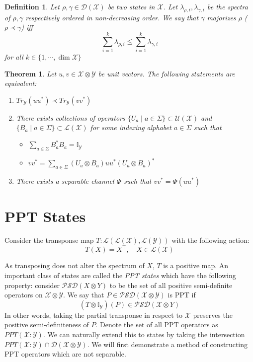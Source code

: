 \documentclass[12pt]{article}
\newcommand{\X}{\mathcal{X}}
\newcommand{\Y}{\mathcal{Y}}
\newcommand{\LX}{\mathcal{L}(\mathcal{X})}
\newcommand{\DX}{\mathcal{D}(\mathcal{X})}
\newtheorem{definition}{Definition}
\newtheorem{theorem}{Theorem}
\begin{document}
\begin{definition}
  Let $\rho, \gamma \in \DX$ be two states in $\X$. Let $\lambda_{\rho, i}, \lambda_{\gamma, i}$ be the spectra of $\rho, \gamma$ respectively ordered in non-decreasing order. We say that $\gamma$ majorizes $\rho$ ($\rho \prec \gamma$) iff
  \[ \sum_{i=1}^k \lambda_{\rho, i} \leq \sum_{i=1}^k \lambda_{\gamma, i} \] for all $k \in \{1,\cdots,\dim{\X}\}$
\end{definition}

\begin{theorem}
  Let $u,v \in \X \otimes \Y$ be unit vectors. The following statements are equivalent:\
  \begin{enumerate}
    \item $Tr_\Y(uu^*) \prec Tr_\Y(vv^*)$
    \item There exists collections of operators $\{U_a\mid a \in \Sigma \} \subset \mathcal{U}(\X)$ and $\{B_a \mid a \in \Sigma\} \subset \LX$ for some indexing alphabet $a \in \Sigma$ such that
    \begin{itemize}
      \item $\sum_{a \in \Sigma} B_a^*B_a = \mathbb{I}_\Y$
      \item $vv^* = \sum_{a \in \Sigma} (U_a \otimes B_a)uu^* (U_a \otimes B_a)^*$
    \end{itemize}
      \item There exists a separable channel $\Phi$ such that $vv^* = \Phi(uu^*)$
  \end{enumerate}
\end{theorem}


\section{PPT States}
 Consider the transponse map $T: \mathcal{L}(\mathcal{L}(\mathcal{X}), \mathcal{L}(\mathcal{Y}))$ with the following action:
\[
T(X) = X^{\intercal}, \quad X \in \LX
\]

As transposing does not alter the spectrum of $X$, $T$ is a positive map. An important class of states are called the \emph{PPT states} which have the following property: consider $\mathcal{PSD}(X \otimes Y)$ to be the set of all positive semi-definite operators on $\X \otimes \Y$. We say that $P \in \mathcal{PSD}(\X \otimes \Y)$ is PPT if
\[
(T \otimes \mathbb{I}_\Y)(P) \in \mathcal{PSD}(\X \otimes Y)
\]
In other words, taking the partial transponse in respect to $\X$ preserves the positive semi-definiteness of $P$. Denote the set of all PPT operators as $PPT(\X : \Y)$. We can naturally extend this to states by taking the intersection $PPT(\X : \Y) \cap \mathcal{D}(\X \otimes \Y)$. We will first demonstrate a method of constructing PPT operators which are not separable.
\end{document}
